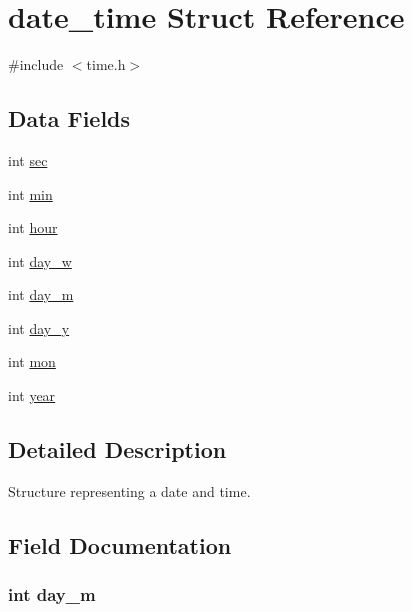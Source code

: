 \hypertarget{structdate__time}{}\section{date\+\_\+time Struct Reference}
\label{structdate__time}


{\ttfamily \#include $<$time.\+h$>$}

\subsection*{Data Fields}
\begin{DoxyCompactItemize}
\item 
int \hyperlink{structdate__time_a90c2ace84e5523d06b7162ea5928acc1}{sec}
\item 
int \hyperlink{structdate__time_a3e202b201e6255d975cd6d3aff1f5a4d}{min}
\item 
int \hyperlink{structdate__time_a15df9ba285cfd842f284025f904edc9c}{hour}
\item 
int \hyperlink{structdate__time_a65f1a8d2d8998298122653d29b282039}{day\+\_\+w}
\item 
int \hyperlink{structdate__time_a02c5941dc0947f075ee0d8f3362921bf}{day\+\_\+m}
\item 
int \hyperlink{structdate__time_ae32b944876e247e9a9fae3371d54c71f}{day\+\_\+y}
\item 
int \hyperlink{structdate__time_a25b602fa15f03b01f61a900f1f68a67d}{mon}
\item 
int \hyperlink{structdate__time_abeac221e38b7b9ce7df8722c842bf671}{year}
\end{DoxyCompactItemize}


\subsection{Detailed Description}
Structure representing a date and time. 

\subsection{Field Documentation}
\subsubsection[{\texorpdfstring{day\+\_\+m}{day_m}}]{\setlength{\rightskip}{0pt plus 5cm}int day\+\_\+m}\hypertarget{structdate__time_a02c5941dc0947f075ee0d8f3362921bf}{}\label{structdate__time_a02c5941dc0947f075ee0d8f3362921bf}
